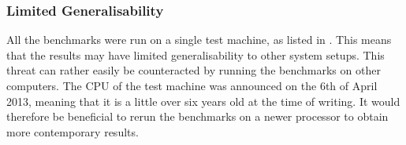 \subsubsection{Limited Generalisability}
All the benchmarks were run on a single test machine, as listed in . This means that the results may have limited generalisability to other system setups. This threat can rather easily be counteracted by running the benchmarks on other computers. The \gls{CPU} of the test machine was announced on the 6th of April 2013\cite{i7:specs}, meaning that it is a little over six years old at the time of writing. It would therefore be beneficial to rerun the benchmarks on a newer processor to obtain more contemporary results.
